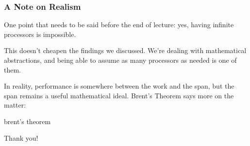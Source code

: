 \documentclass[aspectratio=169]{beamer}
\begin{document}
\begin{frame}[fragile]
  \frametitle{ A Note on Realism }

  One point that needs to be said before the end of lecture: yes, having
  infinite processors is impossible\footnotemark.

  This doesn't cheapen the findings we discussed. We're dealing with 
  mathematical abstractions, and being able to assume as many processors
  as needed is one of them.

  In reality, performance is somewhere between the work and the span, but
  the span remains a useful mathematical ideal. Brent's Theorem says more
  on the matter:

  brent's theorem
\end{frame}

\begin{frame}[plain]
	\begin{center} Thank you! \end{center}
\end{frame}
\end{document}
